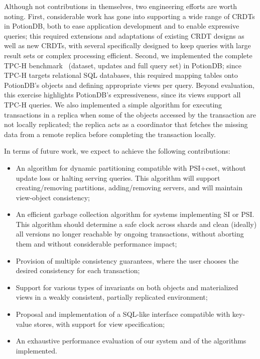 Although not contributions in themselves, two engineering efforts are worth noting.
First, considerable work has gone into supporting a wide range of CRDTs in PotionDB, both to ease application development and to enable expressive queries; this required extensions and adaptations of existing CRDT designs as well as new CRDTs, with several specifically designed to keep queries with large result sets or complex processing efficient.
Second, we implemented the complete TPC-H benchmark~\cite{tpch} (dataset, updates and full query set) in PotionDB; since TPC-H targets relational SQL databases, this required mapping tables onto PotionDB's objects and defining appropriate views per query.
Beyond evaluation, this exercise highlights PotionDB's expressiveness, since its views support all TPC-H queries.
We also implemented a simple algorithm for executing transactions in a replica when some of the objects accessed by the transaction are not locally replicated; the replica acts as a coordinator that fetches the missing data from a remote replica before completing the transaction locally.

In terms of future work, we expect to achieve the following contributions:

\begin{itemize}
	\item An algorithm for dynamic partitioning compatible with PSI+cset, without update loss or halting serving queries. This algorithm will support creating/removing partitions, adding/removing servers, and will maintain view-object consistency;
	\item An efficient garbage collection algorithm for systems implementing SI or PSI. This algorithm should determine a safe clock across shards and clean (ideally) all versions no longer reachable by ongoing transactions, without aborting them and without considerable performance impact;
	\item Provision of multiple consistency guarantees, where the user chooses the desired consistency for each transaction;
	\item Support for various types of invariants on both objects and materialized views in a weakly consistent, partially replicated environment;
	\item Proposal and implementation of a SQL-like interface compatible with key-value stores, with support for view specification;
	\item An exhaustive performance evaluation of our system and of the algorithms implemented.
\end{itemize}

